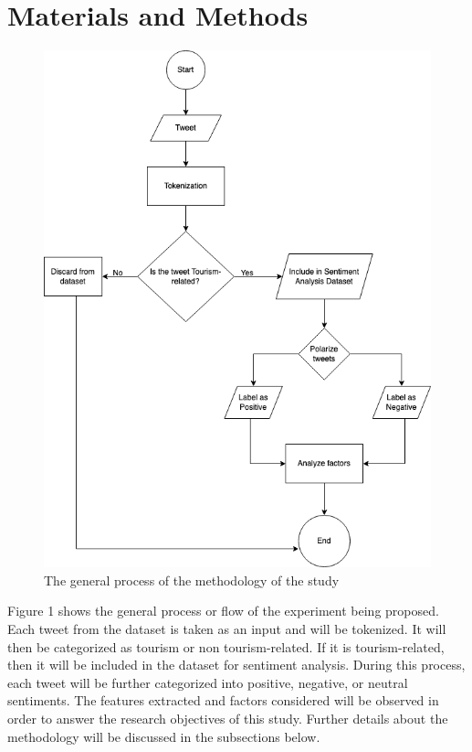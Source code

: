 \documentclass[journal]{./IEEE/IEEEtran}
\begin{document}
\section{Materials and Methods}

\begin{figure}
  \includegraphics[width=\linewidth]{images/methods.drawio.png}
  \caption{The general process of the methodology of the study}
  \label{fig:methodology}
\end{figure}

Figure 1 shows the general process or flow of the experiment being proposed. Each tweet from the dataset is taken as an input and will be tokenized. It will then be categorized as tourism or non tourism-related. If it is tourism-related, then it will be included in the dataset for sentiment analysis. During this process, each tweet will be further categorized into positive, negative, or neutral sentiments. The features extracted and factors considered will be observed in order to answer the research objectives of this study. Further details about the methodology will be discussed in the subsections below. 
\end{document}
